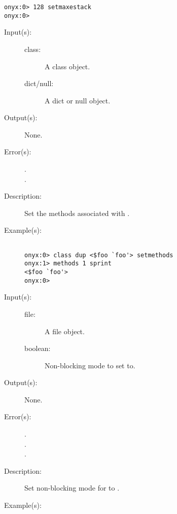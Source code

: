\begin{description}
\begin{description}
\begin{verbatim}
onyx:0> 128 setmaxestack
onyx:0>
		\end{verbatim}
	\end{description}
\label{systemdict:setmethods}
\item[{\onyxop{class dict/null}{setmethods}{--}}: ]
	\begin{description}\item[]
	\item[Input(s): ]
		\begin{description}\item[]
		\item[class: ]
			A class object.
		\item[dict/null: ]
			A dict or null object.
		\end{description}
	\item[Output(s): ] None.
	\item[Error(s): ]
		\begin{description}\item[]
		\item[.]
		\item[.]
		\end{description}
	\item[Description: ]
		Set the methods associated with .
	\item[Example(s): ]\begin{verbatim}

onyx:0> class dup <$foo `foo'> setmethods
onyx:1> methods 1 sprint
<$foo `foo'>
onyx:0>
		\end{verbatim}
	\end{description}
\label{systemdict:setnonblocking}
\item[{\onyxop{file boolean}{setnonblocking}{--}}: ]
	\begin{description}\item[]
	\item[Input(s): ]
		\begin{description}\item[]
		\item[file: ]
			A file object.
		\item[boolean: ]
			Non-blocking mode to set  to.
		\end{description}
	\item[Output(s): ] None.
	\item[Error(s): ]
		\begin{description}\item[]
		\item[.]
		\item[.]
		\item[.]
		\end{description}
	\item[Description: ]
		Set non-blocking mode for  to .
	\item[Example(s): ]\begin{verbatim}


\end{verbatim}
\end{description}
\end{description}
